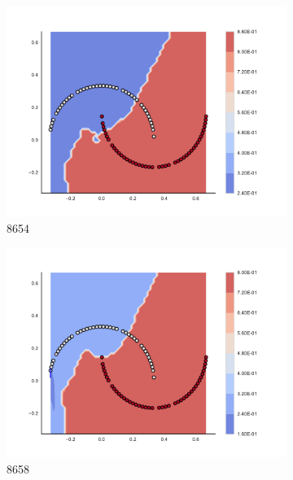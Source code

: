 \begin{figure}[h]
\begin{subfigure}[b]{0.09\textwidth}
    \includegraphics[clip, trim=2.35cm 1.75cm 4.5cm 0cm,width=\textwidth]{img/convergence/8654.pdf}
    \caption{8654}
    \label{fig:convergence_8654}
\end{subfigure}
%
\begin{subfigure}[b]{0.09\textwidth}
    \includegraphics[clip, trim=2.35cm 1.75cm 4.5cm 0cm,width=\textwidth]{img/convergence/8658.pdf}
    \caption{8658}
    \label{fig:convergence_8658}
\end{subfigure}
%
\begin{subfigure}[b]{0.09\textwidth}

\end{subfigure}
\end{figure}

